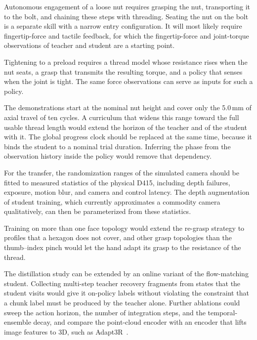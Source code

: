 Autonomous engagement of a loose nut requires grasping the nut, transporting it to the bolt, and chaining these steps with threading. Seating the nut on the bolt is a separate skill with a narrow entry configuration. It will most likely require fingertip-force and tactile feedback, for which the fingertip-force and joint-torque observations of teacher and student are a starting point.

Tightening to a preload requires a thread model whose resistance rises when the nut seats, a grasp that transmits the resulting torque, and a policy that senses when the joint is tight. The same force observations can serve as inputs for such a policy.

The demonstrations start at the nominal nut height and cover only the 5.0\,mm of axial travel of ten cycles. A curriculum that widens this range toward the full usable thread length would extend the horizon of the teacher and of the student with it. The global progress clock should be replaced at the same time, because it binds the student to a nominal trial duration. Inferring the phase from the observation history inside the policy would remove that dependency.

For the transfer, the randomization ranges of the simulated camera should be fitted to measured statistics of the physical D415, including depth failures, exposure, motion blur, and camera and control latency. The depth augmentation of student training, which currently approximates a commodity camera qualitatively, can then be parameterized from these statistics.

Training on more than one face topology would extend the re-grasp strategy to profiles that a hexagon does not cover, and other grasp topologies than the thumb--index pinch would let the hand adapt its grasp to the resistance of the thread.

The distillation study can be extended by an online variant of the flow-matching student. Collecting multi-step teacher recovery fragments from states that the student visits would give it on-policy labels without violating the constraint that a chunk label must be produced by the teacher alone. Further ablations could sweep the action horizon, the number of integration steps, and the temporal-ensemble decay, and compare the point-cloud encoder with an encoder that lifts image features to 3D, such as Adapt3R~\cite{Wilcox2025}.
